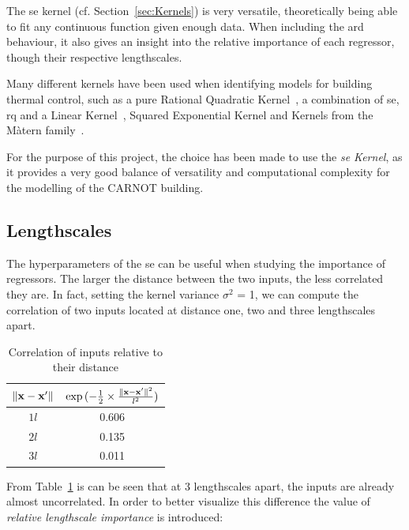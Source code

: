 The \acrlong{se} kernel (cf. Section~\ref{sec:Kernels}) is very versatile,
theoretically being able to fit any continuous function given enough data. When
including the \acrshort{ard} behaviour, it also gives an insight into the
relative importance of each regressor, though their respective lengthscales.

Many different kernels have been used when identifying models for building
thermal control, such as a pure Rational Quadratic
Kernel~\cite{pleweSupervisoryModelPredictive2020}, a combination of
\acrshort{se}, \acrshort{rq} and a Linear
Kernel~\cite{jainLearningControlUsing2018}, Squared Exponential Kernel and
Kernels from the M\`atern family~\cite{massagrayThermalBuildingModelling2016}.

For the purpose of this project, the choice has been made to use the
\textit{\acrlong{se} Kernel}, as it provides a very good balance of versatility
and computational complexity for the modelling of the CARNOT building.

\subsection{Lengthscales}\label{sec:lengthscales}

The hyperparameters of the \acrshort{se} can be useful when studying the
importance of regressors. The larger the distance between the two inputs, the
less correlated they are. In fact, setting the kernel variance $\sigma^2$ = 1,
we can compute the correlation of two inputs located at distance one, two and
three lengthscales apart. 

\begin{table}[ht]
\centering
    \begin{tabular}{||c c ||}
        \hline
        $\lVert\mathbf{x} - \mathbf{x}'\rVert$ &
        $\exp{(-\frac{1}{2}\times\frac{\lVert\mathbf{x} - \mathbf{x}'\rVert^2}{l^2})}$ \\
        \hline \hline
        $1l$ & 0.606 \\
        $2l$ & 0.135 \\
        $3l$ & 0.011 \\
        \hline
    \end{tabular}
\caption{Correlation of inputs relative to their distance}
\label{tab:se_correlation}
\end{table}

From Table~\ref{tab:se_correlation} is can be seen that at 3 lengthscales apart,
the inputs are already almost uncorrelated. In order to better visualize this
difference the value of \textit{relative lengthscale importance} is introduced:

